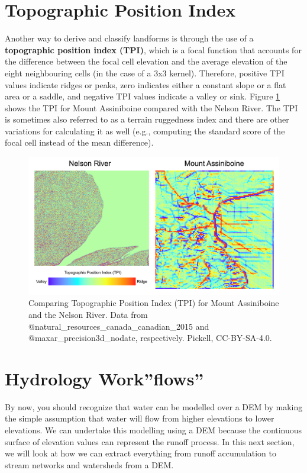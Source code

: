 \documentclass[
]{book}
\begin{document}
\section{Topographic Position Index}\label{topographic-position-index}

Another way to derive and classify landforms is through the use of a \textbf{topographic position index (TPI)}, which is a focal function that accounts for the difference between the focal cell elevation and the average elevation of the eight neighbouring cells (in the case of a 3x3 kernel). Therefore, positive TPI values indicate ridges or peaks, zero indicates either a constant slope or a flat area or a saddle, and negative TPI values indicate a valley or sink. Figure \ref{fig:9-mount-assiniboine-nelson-river-topographic-position-index} shows the TPI for Mount Assiniboine compared with the Nelson River. The TPI is sometimes also referred to as a terrain ruggedness index and there are other variations for calculating it as well (e.g., computing the standard score of the focal cell instead of the mean difference).

\begin{figure}
\includegraphics[width=0.75\linewidth]{images/09-mount-assiniboine-nelson-river-topographic-position-index} \caption{Comparing Topographic Position Index (TPI) for Mount Assiniboine and the Nelson River. Data from @natural_resources_canada_canadian_2015 and @maxar_precision3d_nodate, respectively. Pickell, CC-BY-SA-4.0.}\label{fig:9-mount-assiniboine-nelson-river-topographic-position-index}
\end{figure}

\section{Hydrology Work''flows''}\label{hydrology-workflows}

By now, you should recognize that water can be modelled over a DEM by making the simple assumption that water will flow from higher elevations to lower elevations. We can undertake this modelling using a DEM because the continuous surface of elevation values can represent the runoff process. In this next section, we will look at how we can extract everything from runoff accumulation to stream networks and watersheds from a DEM.
\end{document}
